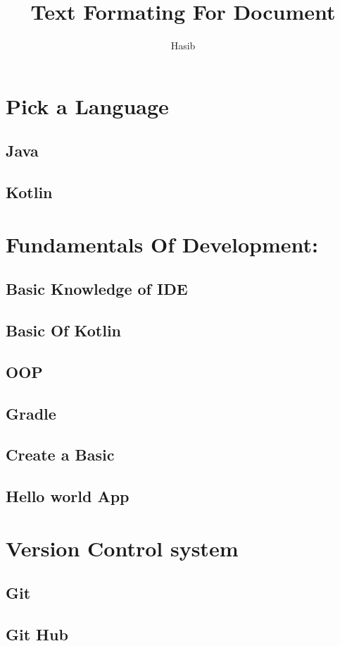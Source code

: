 \documentclass{article}
\author{Hasib}
\title{Text Formating For Document}
\begin{document}
\maketitle
\tableofcontents
\section{Pick a Language}
\subsection{Java}
\subsection{Kotlin}
\section{Fundamentals Of Development:}
\subsection{Basic Knowledge of IDE}
\subsection{Basic Of Kotlin}
\subsection{OOP}
\subsection{Gradle}
\subsection{Create a Basic}
\subsection{Hello world App}
\section{Version Control system}
\subsection{Git}
\subsection{Git Hub}
\end{document}
